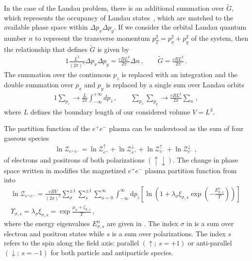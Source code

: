 In the case of the Landau problem, there is an additional summation over $\widetilde{G}$, which represents the occupancy of Landau states~\cite{greiner2012thermodynamics}, which are matched to the available phase space within $\Delta p_{x}\Delta p_{y}$. If we consider the orbital Landau quantum number $n$ to represent the transverse momentum $p_{T}^{2}=p_{x}^{2}+p_{y}^{2}$ of the system, then the relationship that defines $\widetilde{G}$ is given by
\begin{alignat}{1}
 \label{phase:1} \frac{L^{2}}{(2\pi)^{2}}\Delta p_{x}\Delta p_{y}=\frac{eBL^{2}}{2\pi}\Delta n\,,\qquad\widetilde{G}=\frac{eBL^{2}}{2\pi}\,.
\end{alignat}
The summation over the continuous $p_{z}$ is replaced with an integration and the double summation over $p_{x}$ and $p_{y}$ is replaced by a single sum over Landau orbits
\begin{alignat}{1}
 \label{phase:2}
 \sum_{p_{z}}\rightarrow\frac{L}{2\pi}\int^{+\infty}_{-\infty}dp_{z}\,,\qquad\sum_{p_{x}}\sum_{p_{y}}\rightarrow\frac{eBL^{2}}{2\pi}\sum_{n}\,,
\end{alignat}
where $L$ defines the boundary length of our considered volume $V=L^{3}$.

The partition function of the $e^{+}e^{-}$ plasma can be understood as the sum of four gaseous species
\begin{align}
 \label{partition:0} 
 \ln\mathcal{Z}_{e^{+}e^{-}}=\ln\mathcal{Z}_{e^{+}}^{\uparrow}+\ln\mathcal{Z}_{e^{+}}^{\downarrow}+\ln\mathcal{Z}_{e^{-}}^{\uparrow}+\ln\mathcal{Z}_{e^{-}}^{\downarrow}\,,
\end{align}
of electrons and positrons of both polarizations $(\uparrow\downarrow)$. The change in phase space written in  modifies the magnetized $e^{+}e^{-}$ plasma partition function from  into
\begin{gather}
 \label{partition:1}
 \ln\mathcal{Z}_{e^{+}e^{-}}=\frac{e{B}V}{(2\pi)^{2}}\sum_{\sigma}^{\pm1}\sum_{s}^{\pm1}\sum_{n=0}^{\infty}\int_{-\infty}^{\infty}\mathrm{d}p_{z}\left[\ln\left(1+\lambda_{\sigma}\xi_{\sigma,s}\exp\left(-\frac{E_{\sigma,s}^{n}}{T}\right)\right)\right]\,\\
 \label{partition:2} 
 \Upsilon_{\sigma,s} =\lambda_{\sigma}\xi_{\sigma,s} = \exp{\frac{\mu_{\sigma}+\zeta_{\sigma,s}}{T}}\,,
\end{gather}
where the energy eigenvalues $E_{\sigma,s}^{n}$ are given in . The index $\sigma$ in  is a sum over electron and positron states while $s$ is a sum over polarizations. The index $s$ refers to the spin along the field axis: parallel $(\uparrow;\ s=+1)$ or anti-parallel $(\downarrow;\ s=-1)$ for both particle and antiparticle species.

